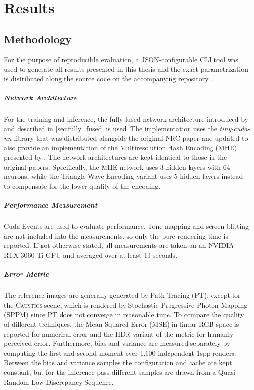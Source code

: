 
\chapter{Results}
\label{chap:results}

\section{Methodology}
For the purpose of reproducible evaluation, a JSON-configurable CLI tool was used to generate all results presented in this thesis and the exact parametrization is distributed along the source code on the accompanying repository \parencite{stamm2025}.

\paragraph{Network Architecture} For the training and inference, the fully fused network architecture introduced by \textcite{muller2021} and described in \cref{sec:fully_fused} is used.
The implementation uses the \emph{tiny-cuda-nn} library \parencite{muller2021a} that was distributed alongside the original NRC paper and updated to also provide an implementation of the Multiresolution Hash Encoding (MHE) presented by \textcite{muller2022}.
The network architectures are kept identical to those in the original papers.
Specifically, the MHE network uses 3 hidden layers with 64 neurons, while the Triangle Wave Encoding variant uses 5 hidden layers instead to compensate for the lower quality of the encoding.

\paragraph{Performance Measurement}
Cuda Events are used to evaluate performance.
Tone mapping and screen blitting are not included into the measurements, so only the pure rendering time is reported.
If not otherwise stated, all measurements are taken on an NVIDIA RTX 3060 Ti GPU and averaged over at least 10 seconds.

\paragraph{Error Metric}
The reference images are generally generated by Path Tracing (PT), except for the \textsc{Caustics} scene, which is rendered by Stochastic Progressive Photon Mapping (SPPM) \parencite{hachisuka2009a} since PT does not converge in reasonable time.
To compare the quality of different techniques, the Mean Squared Error (MSE) in linear RGB space is reported for numerical error and the HDR variant of the \FLIP metric \parencite{andersson2021} for humanly perceived error.
Furthermore, bias and variance are measured separately by computing the first and second moment over 1,000 independent 1spp renders.
Between the bias and variance samples the configuration and cache are kept constant, but for the inference pass different samples are drawn from a Quasi-Random Low Discrepancy Sequence.

